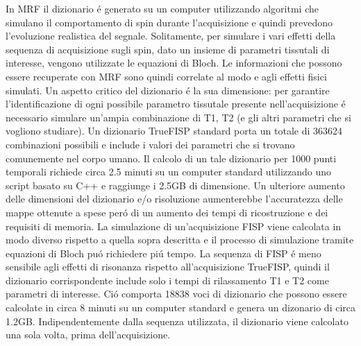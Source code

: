 \documentclass[a4paper,10pt]{article}
\begin{document}
 In MRF il dizionario \'e generato su un computer utilizzando algoritmi che simulano il comportamento di spin durante l'acquisizione e quindi prevedono l'evoluzione realistica del segnale. Solitamente, per simulare i vari effetti della sequenza di acquisizione sugli spin, dato un insieme di parametri tissutali di interesse, vengono utilizzate le equazioni di Bloch. Le informazioni che possono essere recuperate con MRF sono quindi correlate al modo e agli effetti fisici simulati. Un aspetto critico del dizionario \'e la sua dimensione: per garantire l'identificazione di ogni possibile parametro tissutale presente nell'acquisizione \'e necessario simulare un'ampia combinazione di T1, T2 (e gli altri parametri che si vogliono studiare). Un dizionario TrueFISP standard porta un totale di 363624 combinazioni possibili e include i valori dei parametri che si trovano comunemente nel corpo umano. Il calcolo di un tale dizionario per 1000 punti temporali richiede circa 2.5 minuti su un computer standard utilizzando uno script basato su C++ e raggiunge i 2.5GB di dimensione. Un ulteriore aumento delle dimensioni del dizionario e/o risoluzione aumenterebbe l'accuratezza delle mappe ottenute a spese per\'o di un aumento dei tempi di ricostruzione e dei requisiti di memoria. La simulazione di un'acquisizione FISP viene calcolata in modo diverso rispetto a quella sopra descritta e il processo di simulazione tramite equazioni di Bloch pu\'o richiedere pi\'u tempo. La sequenza di FISP \'e meno sensibile agli effetti di risonanza rispetto all'acquisizione TrueFISP, quindi il dizionario corrispondente include solo i tempi di rilassamento T1 e T2 come parametri di interesse. Ci\'o comporta 18838 voci di dizionario che possono essere calcolate in circa 8 minuti su un computer standard e genera un dizonario di circa 1.2GB. Indipendentemente dalla sequenza utilizzata, il dizionario viene calcolato una sola volta, prima dell'acquisizione. 
 
\end{document}
